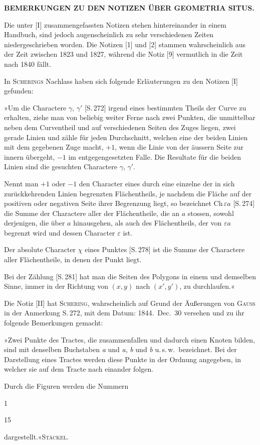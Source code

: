 \clearpage{}

\begin{center}
\textbf{BEMERKUNGEN ZU DEN NOTIZEN ÜBER GEOMETRIA SITUS.}
\end{center}

Die unter [I] zusammengefassten Notizen stehen hintereinander in einem
Handbuch, sind jedoch augenscheinlich zu sehr verschiedenen Zeiten
niedergeschrieben worden. Die Notizen [1] und [2] stammen wahrscheinlich
aus der Zeit zwischen 1823 und 1827, während die Notiz [9] vermutlich in
die Zeit nach 1840 fällt.

In \textsc{Scherings} Nachlass haben sich folgende Erläuterungen zu den Notizen
[I] gefunden:

»Um die Charactere $\gamma$, $\gamma'$ [S.\,272] irgend eines bestimmten
Theils der Curve zu erhalten, ziehe man von beliebig weiter Ferne nach
zwei Punkten, die unmittelbar neben dem Curventheil und auf verschiedenen
Seiten des Zuges liegen, zwei gerade Linien und zähle für jeden
Durchschnitt, welchen eine der beiden Linien mit dem gegebenen Zuge
macht, $+1$, wenn die Linie von der äussern Seite zur innern übergeht,
$-1$ im entgegengesetzten Falle. Die Resultate für die beiden Linien sind
die gesuchten Charactere $\gamma$, $\gamma'$.

Nennt man $+1$ oder $-1$ den Character eines durch eine einzelne der in
sich zurückkehrenden Linien begrenzten Flächentheils, je nachdem die
Fläche auf der positiven oder negativen Seite ihrer Begrenzung liegt, so
bezeichnet $\mathrm{Ch}\,\varepsilon a$ [S.\,274] die Summe der
Charactere aller der Flächentheile, die an $a$ stossen, sowohl derjenigen,
die über $a$ hinausgehen, als auch des Flächentheils, der von
$\varepsilon a$ begrenzt wird und dessen Character $\varepsilon$ ist.

Der absolute Character $\chi$ eines Punktes [S.\,278] ist die Summe der
Charactere aller Flächentheile, in denen der Punkt liegt.

Bei der Zählung [S.\,281] hat man die Seiten des Polygons in einem und
demselben Sinne, immer in der Richtung von $(x, y)$ nach $(x', y')$, zu
durchlaufen.«

Die Notiz [II] hat \textsc{Schering}, wahrscheinlich auf Grund der Äußerungen
von \textsc{Gauss} in der Anmerkung S.\,272, mit dem Datum: 1844.\ Dec.\ 30
versehen und zu ihr folgende Bemerkungen gemacht:

»Zwei Punkte des Tractes, die zusammenfallen und dadurch einen Knoten
bilden, sind mit denselben Buchstaben \emph{a} und \emph{a}, \emph{b} und
\emph{b} u.\,s.\,w.\ bezeichnet. Bei der Darstellung eines Tractes werden
diese Punkte in der Ordnung angegeben, in welcher sie auf dem Tracte nach
einander folgen.

Durch die Figuren werden die Nummern

\begin{center}
1    

15
\end{center}

dargestellt.«\hfill \textsc{Stäckel}.
